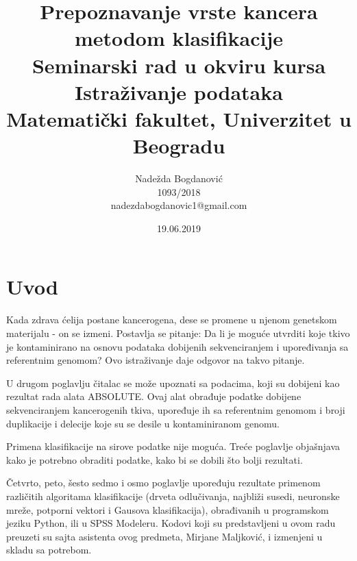 \documentclass[a4paper]{article}
\begin{document}
\title{Prepoznavanje vrste kancera metodom klasifikacije\\ \small{Seminarski rad u okviru kursa\\Istraživanje podataka\\ Matematički fakultet, Univerzitet u Beogradu}}

\author{Nadežda Bogdanović\\1093/2018\\\small{nadezdabogdanovic1@gmail.com}}

\date{19.06.2019}

\maketitle



\newpage

\tableofcontents

\newpage


\section{Uvod}
\label{sec:Uvod}

Kada zdrava ćelija postane kancerogena, dese se  promene u njenom genetskom materijalu - on se izmeni. Postavlja se pitanje: Da li je moguće utvrditi koje tkivo je kontaminirano na osnovu podataka dobijenih sekvenciranjem i upoređivanja sa referentnim genomom? Ovo istraživanje daje odgovor na takvo pitanje.

U drugom poglavlju čitalac se može upoznati sa podacima\cite{podaci}, koji su dobijeni kao rezultat rada alata ABSOLUTE\cite{ABSOLUTE}. Ovaj alat obrađuje podatke dobijene sekvenciranjem kancerogenih tkiva, upoređuje ih sa referentnim genomom i broji duplikacije i delecije koje su se desile u kontaminiranom genomu.

Primena klasifikacije na sirove podatke nije moguća. Treće poglavlje objašnjava kako je potrebno obraditi podatke, kako bi se dobili što bolji rezultati.

Četvrto, peto, šesto sedmo i osmo poglavlje upoređuju rezultate primenom različitih algoritama klasifikacije (drveta odlučivanja, najbliži susedi, neuronske mreže, potporni vektori i Gausova klasifikacija), obrađivanih u programskom jeziku Python, ili u SPSS Modeleru. Kodovi koji su predstavljeni u ovom radu preuzeti su sajta asistenta ovog predmeta\cite{mm}, Mirjane Maljković, i izmenjeni u skladu sa potrebom.
\end{document}
